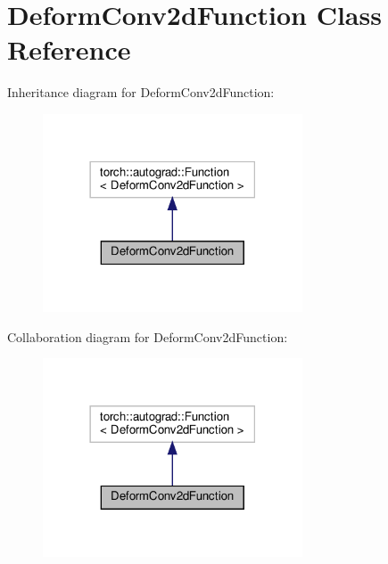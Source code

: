 \hypertarget{classDeformConv2dFunction}{}\section{Deform\+Conv2d\+Function Class Reference}
\label{classDeformConv2dFunction}


Inheritance diagram for Deform\+Conv2d\+Function\+:
\nopagebreak
\begin{figure}[H]
\begin{center}
\leavevmode
\includegraphics[width=218pt]{classDeformConv2dFunction__inherit__graph}
\end{center}
\end{figure}


Collaboration diagram for Deform\+Conv2d\+Function\+:
\nopagebreak
\begin{figure}[H]
\begin{center}
\leavevmode
\includegraphics[width=218pt]{classDeformConv2dFunction__coll__graph}
\end{center}
\end{figure}

